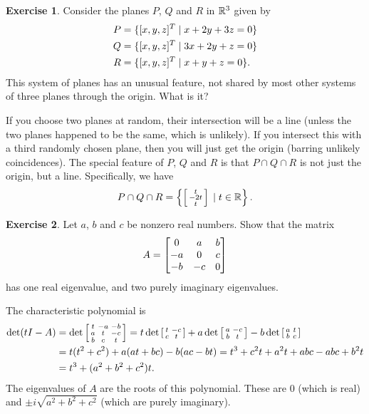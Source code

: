 \documentclass[a4paper]{amsart}
\theoremstyle{definition}
\newtheorem{exercise}{Exercise}
\newenvironment{solution}{{\noindent \bf Solution:}}{}
\begin{document}
\begin{exercise}\label{ex-degenerate-planes}
 Consider the planes $P$, $Q$ and $R$ in ${\mathbb{R}}^3$ given by 
 \begin{align*}
  P &= \{ [x,y,z]^T \;|\; x+2y+3z=0 \} \\
  Q &= \{ [x,y,z]^T \;|\; 3x+2y+z=0 \} \\
  R &= \{ [x,y,z]^T \;|\; x+y+z=0 \}.
 \end{align*}
 This system of planes has an unusual feature, not shared by
 most other systems of three planes through the origin.
 What is it? 
\end{exercise}
\begin{solution}
 If you choose two planes at random, their intersection will
 be a line (unless the two planes happened to be the same,
 which is unlikely).  If you intersect this with a third
 randomly chosen plane, then you will just get the origin
 (barring unlikely coincidences).  The special feature of
 $P$, $Q$ and $R$ is that $P\cap Q\cap R$ is not just the
 origin, but a line.  Specifically, we have
 \[ P\cap Q\cap R =
      \left\{\left[\begin{smallmatrix} t\\ -2t\\ t\end{smallmatrix}\right] \;|\; t\in{\mathbb{R}}\right\}.
 \]
\end{solution}

\begin{exercise}\label{ex-antisym-spectrum}
 Let $a$, $b$ and $c$ be nonzero real numbers.  Show that
 the matrix
 \[ A = \begin{bmatrix} 0 & a & b \\ -a & 0 & c \\ -b & -c & 0 \end{bmatrix}
 \]
 has one real eigenvalue, and two purely imaginary
 eigenvalues. 
\end{exercise}
\begin{solution}
 The characteristic polynomial is
 \begin{align*}
  \det(tI-A)
   &= \det\left[\begin{smallmatrix} t & -a & -b \\
               a & t & -c \\
               b & c & t \end{smallmatrix}\right]
    =  t \det\left[\begin{smallmatrix} t & -c \\ c & t \end{smallmatrix}\right] 
      +a \det\left[\begin{smallmatrix} a & -c \\ b & t \end{smallmatrix}\right] 
      -b \det\left[\begin{smallmatrix} a & t \\ b & c \end{smallmatrix}\right] \\
   &= t(t^2+c^2) +a(at+bc) -b(ac-bt) 
    = t^3 + c^2t + a^2t + abc - abc + b^2t \\
   &= t^3+(a^2+b^2+c^2)t.
 \end{align*}
 The eigenvalues of $A$ are the roots of this polynomial.
 These are $0$ (which is real) and $\pm i\sqrt{a^2+b^2+c^2}$
 (which are purely imaginary).
\end{solution}
\end{document}
